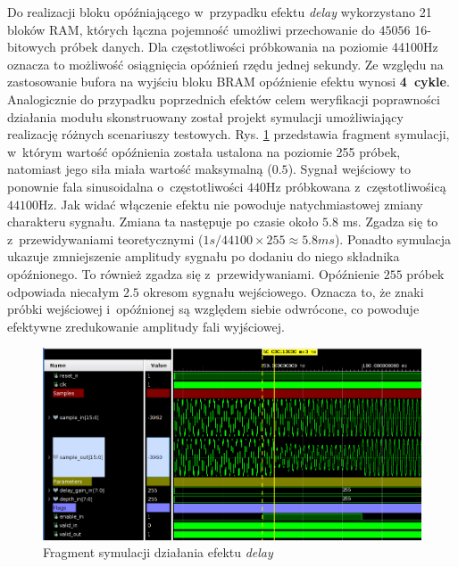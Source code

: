 Do realizacji bloku opóźniającego w~przypadku efektu \textit{delay} wykorzystano 21 bloków RAM, których łączna pojemność umożliwi przechowanie do $45056$ 16-bitowych próbek danych. Dla częstotliwości próbkowania na poziomie 44100Hz oznacza to możliwość osiągnięcia opóźnień rzędu jednej sekundy. Ze względu na zastosowanie bufora na wyjściu bloku BRAM opóźnienie efektu wynosi \textbf{4~cykle}. Analogicznie do przypadku poprzednich efektów celem weryfikacji poprawności działania modułu skonstruowany został projekt symulacji umożliwiający realizację różnych scenariuszy testowych. Rys. \ref{sim-delay} przedstawia fragment symulacji, w~którym wartość opóźnienia została ustalona na poziomie 255 próbek, natomiast jego siła miała wartość maksymalną ($0.5$). Sygnał wejściowy to ponownie fala sinusoidalna o~częstotliwości $440$Hz próbkowana z~częstotliwośicą $44100$Hz. Jak widać włączenie efektu nie powoduje natychmiastowej zmiany charakteru sygnału. Zmiana ta następuje po czasie około $5.8$ ms. Zgadza się to z~przewidywaniami teoretycznymi ($1s / 44100 \times 255 \approx 5.8 ms$). Ponadto symulacja ukazuje zmniejszenie amplitudy sygnału po dodaniu do niego składnika opóźnionego. To również zgadza się z~przewidywaniami. Opóźnienie $255$ próbek odpowiada niecałym $2.5$ okresom sygnału wejściowego. Oznacza to, że znaki próbki wejściowej i~opóźnionej są względem siebie odwrócone, co powoduje efektywne zredukowanie amplitudy fali wyjściowej.

\vspace{0.5cm}
\begin{figure}[ht]
    \centering
    \includegraphics[width=\textwidth]{img/sim/delay_sim_high_gain.png}
    \captionsetup{format=plain,justification=centering}
    \caption{Fragment symulacji działania efektu \textit{delay}}
    \label{sim-delay}
\end{figure}
\vspace{0.5cm}